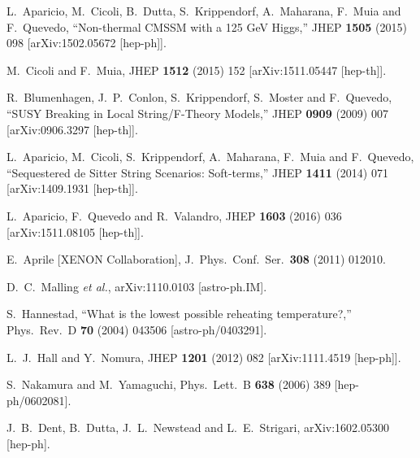 \documentclass[11pt,a4paper]{article}
\begin{document}
\begin{thebibliography}{9}
  
L.~Aparicio, M.~Cicoli, B.~Dutta, S.~Krippendorf, A.~Maharana, F.~Muia and F.~Quevedo,
  ``Non-thermal CMSSM with a 125 GeV Higgs,''
  JHEP {\bf 1505} (2015) 098
  [arXiv:1502.05672 [hep-ph]].
  
  M.~Cicoli and F.~Muia,
  JHEP {\bf 1512} (2015) 152
  [arXiv:1511.05447 [hep-th]].

  
  
  
  
  
  
  
  
  
  

  R.~Blumenhagen, J.~P.~Conlon, S.~Krippendorf, S.~Moster and F.~Quevedo,
  ``SUSY Breaking in Local String/F-Theory Models,''
  JHEP {\bf 0909} (2009) 007
  [arXiv:0906.3297 [hep-th]].

  L.~Aparicio, M.~Cicoli, S.~Krippendorf, A.~Maharana, F.~Muia and F.~Quevedo,
  ``Sequestered de Sitter String Scenarios: Soft-terms,''
  JHEP {\bf 1411} (2014) 071
  [arXiv:1409.1931 [hep-th]].
  

  L.~Aparicio, F.~Quevedo and R.~Valandro,
  JHEP {\bf 1603} (2016) 036
  [arXiv:1511.08105 [hep-th]].
 
 
  E.~Aprile [XENON Collaboration],
  J.\ Phys.\ Conf.\ Ser.\  {\bf 308} (2011) 012010.

  D.~C.~Malling {\it et al.},
  arXiv:1110.0103 [astro-ph.IM].
 
  S.~Hannestad,
  ``What is the lowest possible reheating temperature?,''
  Phys.\ Rev.\ D {\bf 70} (2004) 043506
  [astro-ph/0403291].
  
  L.~J.~Hall and Y.~Nomura,
  JHEP {\bf 1201} (2012) 082
  [arXiv:1111.4519 [hep-ph]].
  
  
  S.~Nakamura and M.~Yamaguchi,
  Phys.\ Lett.\ B {\bf 638} (2006) 389
  [hep-ph/0602081].


  
  J.~B.~Dent, B.~Dutta, J.~L.~Newstead and L.~E.~Strigari,
  arXiv:1602.05300 [hep-ph].
  
\end{thebibliography}
\end{document}
